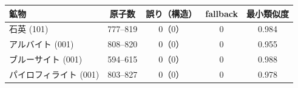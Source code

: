 \begin{tabular}{lcccc}
\toprule
鉱物 & 原子数 & 誤り（構造） & fallback & 最小類似度 \\
\midrule
石英 (101) & 777--819 & 0（0） & 0 & 0.984 \\
アルバイト (001) & 808--820 & 0（0） & 0 & 0.955 \\
ブルーサイト (001) & 594--615 & 0（0） & 0 & 0.988 \\
パイロフィライト (001) & 803--827 & 0（0） & 0 & 0.978 \\
\bottomrule
\end{tabular}
